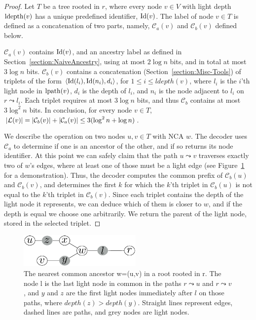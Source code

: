 	\begin{proof}
	Let  $T$  be a tree rooted in  $r$, where every node  $v \in V$ with light depth  $\operatorname{ldepth}(v)$ has   a unique  predefined identifier, $\operatorname{Id}(v)$.
 The label of node $v \in T$ is  defined as a concatenation of two parts, namely, $\mathcal{C}_a(v)$ and $\mathcal{C}_b(v)$ defined below.
	 
	 $\mathcal{C}_a(v)$   contains $\operatorname{Id}(v)$, and  an ancestry label as defined in Section~\ref{section:NaiveAncestry}, using at most $2 \log n $ bits, and in total at most $3 \log n $ bits.
	  $\mathcal{C}_b(v)$  contains a  concatenation (Section~\ref{section:Misc-Tools}) of triplets  of the form $\left \langle \operatorname{Id}(l_i),\operatorname{Id}(n_i),d_i \right \rangle $, for $ 1 \leq i \leq  ldepth(v)$, where 
	 $l_i$  is the $i$'th light node in $\operatorname{lpath}(v)$, $d_i$ is the depth of $l_i$,  and $n_i$ is the node adjacent to $l_i$ on  $ r \leadsto l_i$.
	 Each triplet requires at most $3 \log n$ bits, and thus  $\mathcal{C}_b$ contains at most $3\log^2 n$ bits.
	 In conclusion, for every node $v \in T$,  $\vert  \mathcal{L}(v) \vert = \vert \mathcal{C}_b(v) \vert  + \vert \mathcal{C}_a(v) \vert \leq 3(\log^2 n+ \log n)$.
	 
	We describe the operation on two nodes $u,v \in T$ with NCA $w$.
	The decoder  uses $\mathcal{C}_a$  to determine if one is an ancestor of the other, and if so returns its node identifier.
	At this point we can safely claim that  the path $u \leadsto v$ traverses exactly two  of $w$'s edges, where at least one of those  must be a light edge (see Figure~\ref{fig:NCAPeleg} for a demonstration).
	Thus, the decoder computes the common prefix of $\mathcal{C}_b(u)$ and $\mathcal{C}_b(v)$, and determines the first  $k$ for which the $k$'th triplet in $\mathcal{C}_b(u)$  is not equal to the $k$'th triplet in $\mathcal{C}_b(v)$.
	Since each triplet contains the depth of the light node it represents, we can deduce which of them is closer to $w$, and if the depth is equal we choose one arbitrarily.
	We  return the parent of the light node, stored in the selected triplet. 
	\end{proof}
	
					\begin{figure}[!ht] 
				\centering
				\includegraphics[width=60mm]{./Figures/NCApeleg.pdf}
				\caption{The nearest common ancestor w=\NCA(u,v) in a root rooted in r. The node  l is the last light node in common in the paths $r \leadsto u$ and $r \leadsto v$, and  $y$ and $z$ are the first light nodes immediately after $l$ on those paths, where $depth(z)>depth(y)$. Straight lines represent edges, dashed lines are paths, and grey nodes are light nodes. }
				\label{fig:NCAPeleg}
			\end{figure}
			
